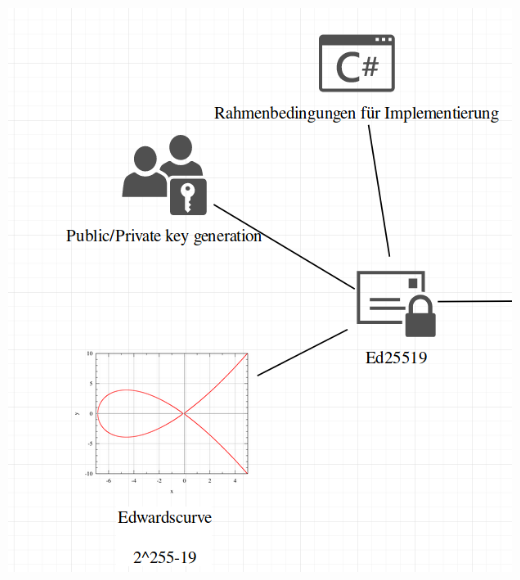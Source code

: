 \documentclass[
  11 pt,
  ignorenonframetext,
  aspectratio=43,
]{beamer}
\begin{document}
\begin{frame}{}
\protect\hypertarget{section-1}{}
\includegraphics{Abbildungen/Punkt1.png}
\end{frame}
\end{document}
